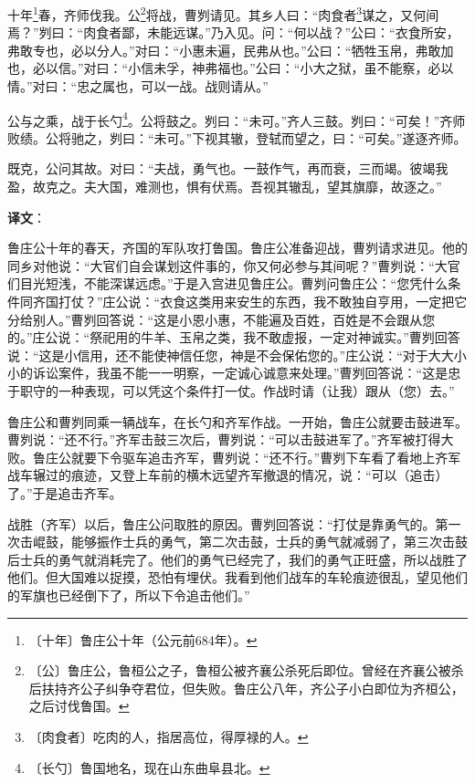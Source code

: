 \documentclass[12pt,UTF-8,openany]{ctexbook}
\begin{document}
\begin{normalsize}
    
    十年\footnote{〔十年〕鲁庄公十年（公元前684年）。}春，齐师伐我。公\footnote{〔公〕鲁庄公，鲁桓公之子，鲁桓公被齐襄公杀死后即位。曾经在齐襄公被杀后扶持齐公子纠争夺君位，但失败。鲁庄公八年，齐公子小白即位为齐桓公，之后讨伐鲁国。}将战，曹刿请见。其乡人曰：“肉食者\footnote{〔肉食者〕吃肉的人，指居高位，得厚禄的人。}谋之，又何间焉？”刿曰：“肉食者鄙，未能远谋。”乃入见。问：“何以战？”公曰：“衣食所安，弗敢专也，必以分人。”对曰：“小惠未遍，民弗从也。”公曰：“牺牲玉帛，弗敢加也，必以信。”对曰：“小信未孚，神弗福也。”公曰：“小大之狱，虽不能察，必以情。”对曰：“忠之属也，可以一战。战则请从。”
    
    公与之乘，战于长勺\footnote{〔长勺〕鲁国地名，现在山东曲阜县北。}。公将鼓之。刿曰：“未可。”齐人三鼓。刿曰：“可矣！”齐师败绩。公将驰之，刿曰：“未可。”下视其辙，登轼而望之，曰：“可矣。”遂逐齐师。
    
    既克，公问其故。对曰：“夫战，勇气也。一鼓作气，再而衰，三而竭。彼竭我盈，故克之。夫大国，难测也，惧有伏焉。吾视其辙乱，望其旗靡，故逐之。”
\end{normalsize}


\newpage

\textbf{译文}：

\vspace{1em}

\begin{normalsize}
    
    鲁庄公十年的春天，齐国的军队攻打鲁国。鲁庄公准备迎战，曹刿请求进见。他的同乡对他说：“大官们自会谋划这件事的，你又何必参与其间呢？”曹刿说：“大官们目光短浅，不能深谋远虑。”于是入宫进见鲁庄公。曹刿问鲁庄公：“您凭什么条件同齐国打仗？”庄公说：“衣食这类用来安生的东西，我不敢独自亨用，一定把它分给别人。”曹刿回答说：“这是小恩小惠，不能遍及百姓，百姓是不会跟从您的。”庄公说：“祭祀用的牛羊、玉帛之类，我不敢虚报，一定对神诚实。”曹刿回答说：“这是小信用，还不能使神信任您，神是不会保佑您的。”庄公说：“对于大大小小的诉讼案件，我虽不能一一明察，一定诚心诚意来处理。”曹刿回答说：“这是忠于职守的一种表现，可以凭这个条件打一仗。作战时请（让我）跟从（您）去。”
    
    鲁庄公和曹刿同乘一辆战车，在长勺和齐军作战。一开始，鲁庄公就要击鼓进军。曹刿说：“还不行。”齐军击鼓三次后，曹刿说：“可以击鼓进军了。”齐军被打得大败。鲁庄公就要下令驱车追击齐军，曹刿说：“还不行。”曹刿下车看了看地上齐军战车辗过的痕迹，又登上车前的横木远望齐军撤退的情况，说：“可以（追击）了。”于是追击齐军。
    
    战胜（齐军）以后，鲁庄公问取胜的原因。曹刿回答说：“打仗是靠勇气的。第一次击崐鼓，能够振作士兵的勇气，第二次击鼓，士兵的勇气就减弱了，第三次击鼓后士兵的勇气就消耗完了。他们的勇气已经完了，我们的勇气正旺盛，所以战胜了他们。但大国难以捉摸，恐怕有埋伏。我看到他们战车的车轮痕迹很乱，望见他们的军旗也已经倒下了，所以下令追击他们。”
    
\end{normalsize}
\end{document}
